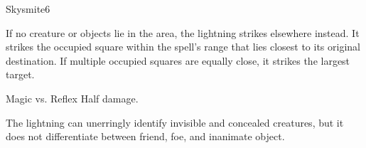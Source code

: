\begin{spellsection}{Skysmite}{6}
    \begin{spellheader}
    \end{spellheader}
    \begin{spellcontent}
        \begin{spelltargetinginfo}
            \spellrng{\rngext}
            \spellspecial If no creature or objects lie in the area, the lightning strikes elsewhere instead. It strikes the occupied square within the spell's range that lies closest to its original destination. If multiple occupied squares are equally close, it strikes the largest target.
        \end{spelltargetinginfo}
        \begin{spelleffects}
            \begin{spellattack}{Magic vs. Reflex}
                \spellsuccess {}
                \spellfailure Half damage.
            \end{spellattack}
        \end{spelleffects}
    \end{spellcontent}
    \begin{spellfooter}
        \spellnotes The lightning can unerringly identify invisible and concealed creatures, but it does not differentiate between friend, foe, and inanimate object.
        \miscastexplode
    \end{spellfooter}
\end{spellsection}

